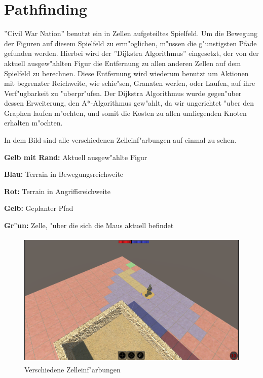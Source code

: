 \chapter{Pathfinding}
''Civil War Nation'' benutzt ein in Zellen aufgeteiltes Spielfeld. Um die Bewegung der Figuren auf diesem Spielfeld zu erm"oglichen, m"ussen die g"unstigsten Pfade gefunden werden. Hierbei wird der ''Dijkstra Algorithmus'' eingesetzt, der von der aktuell ausgew"ahlten Figur die Entfernung zu allen anderen Zellen auf dem Spielfeld zu berechnen. Diese Entfernung wird wiederum benutzt um Aktionen mit begrenzter Reichweite, wie schie"sen, Granaten werfen, oder Laufen, auf ihre Verf"ugbarkeit zu "uberpr"ufen.
Der Dijkstra Algorithmus wurde gegen"uber dessen Erweiterung, den A*-Algorithmus gew"ahlt, da wir ungerichtet "uber den Graphen laufen m"ochten, und somit die Kosten zu allen umliegenden Knoten erhalten m"ochten.

In dem Bild sind alle verschiedenen Zelleinf"arbungen auf einmal zu sehen.
\begin{description}[]
	\item \textbf{Gelb mit Rand:} Aktuell ausgew"ahlte Figur
	\item \textbf{Blau:} Terrain in Bewegungsreichweite
	\item \textbf{Rot:} Terrain in Angriffsreichweite
	\item \textbf{Gelb:} Geplanter Pfad
	\item \textbf{Gr"un:} Zelle, "uber die sich die Maus aktuell befindet
\end{description}

\begin{figure}
	\centering
	\includegraphics[height=6.5cm]{images/cell_info.png}
	\caption{Verschiedene Zelleinf"arbungen}
	\label{fig:cell_coloring}
\end{figure}
